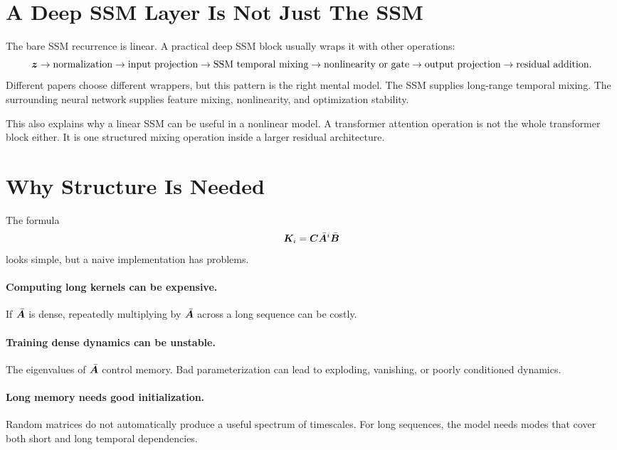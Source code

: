 \section{A Deep SSM Layer Is Not Just The SSM}

The bare SSM recurrence is linear. A practical deep SSM block usually wraps it with other
operations:
\[
  \bm{z}
  \rightarrow
  \text{normalization}
  \rightarrow
  \text{input projection}
  \rightarrow
  \text{SSM temporal mixing}
  \rightarrow
  \text{nonlinearity or gate}
  \rightarrow
  \text{output projection}
  \rightarrow
  \text{residual addition}.
\]
Different papers choose different wrappers, but this pattern is the right mental model.
The SSM supplies long-range temporal mixing. The surrounding neural network supplies
feature mixing, nonlinearity, and optimization stability.

This also explains why a linear SSM can be useful in a nonlinear model. A transformer
attention operation is not the whole transformer block either. It is one structured
mixing operation inside a larger residual architecture.

\section{Why Structure Is Needed}

The formula
\[
  \bm{K}_i = \bm{C}\bar{\bm{A}}^i\bar{\bm{B}}
\]
looks simple, but a naive implementation has problems.

\paragraph{Computing long kernels can be expensive.}
If $\bar{\bm{A}}$ is dense, repeatedly multiplying by $\bar{\bm{A}}$ across a long sequence can
be costly.

\paragraph{Training dense dynamics can be unstable.}
The eigenvalues of $\bar{\bm{A}}$ control memory. Bad parameterization can lead to exploding,
vanishing, or poorly conditioned dynamics.

\paragraph{Long memory needs good initialization.}
Random matrices do not automatically produce a useful spectrum of timescales. For long
sequences, the model needs modes that cover both short and long temporal dependencies.

